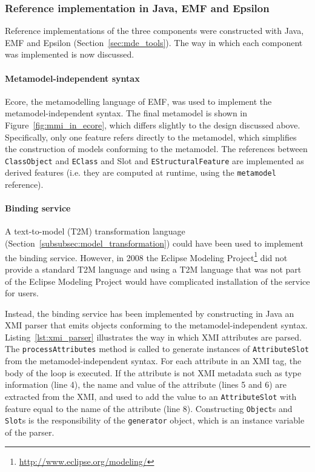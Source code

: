 \subsubsection{Reference implementation in Java, EMF and Epsilon}
\label{subsubsec:mmi_impl}
Reference implementations of the three components were constructed with Java, EMF and Epsilon (Section~\ref{sec:mde_tools}). The way in which each component was implemented is now discussed.

\paragraph{Metamodel-independent syntax} Ecore, the metamodelling language of EMF, was used to implement the metamodel-independent syntax. The final metamodel is shown in Figure~\ref{fig:mmi_in_ecore}, which differs slightly to the design discussed above. Specifically, only one feature refers directly to the metamodel, which simplifies the construction of models conforming to the metamodel. The references between \texttt{Cl\-a\-ssOb\-je\-ct} and \texttt{ECl\-a\-ss} and Slot and \texttt{ESt\-ru\-ct\-ur\-alFe\-at\-u\-re} are implemented as derived features (i.e. they are computed at runtime, using the \texttt{me\-ta\-mo\-del} reference). 

\paragraph{Binding service} A text-to-model (T2M) transformation language (Section~\ref{subsubsec:model_transformation}) could have been used to implement the binding service. However, in 2008 the Eclipse Modeling Project\footnote{\url{http://www.eclipse.org/modeling/}} did not provide a standard T2M language and using a T2M language that was not part of the Eclipse Modeling Project would have complicated installation of the service for users.

Instead, the binding service has been implemented by constructing in Java an XMI parser that emits objects conforming to the metamodel-independent syntax. Listing~\ref{lst:xmi_parser} illustrates the way in which XMI attributes are parsed. The \texttt{pr\-oc\-e\-ssAtt\-rib\-ut\-es} method is called to generate instances of \texttt{At\-tr\-ibu\-teSl\-ot} from the metamodel-independent syntax. For each attribute in an XMI tag, the body of the loop is executed. If the attribute is not XMI metadata such as type information (line 4), the name and value of the attribute (lines 5 and 6) are extracted from the XMI, and used to add the value to an \texttt{At\-tr\-ibu\-teSl\-ot} with feature equal to the name of the attribute (line 8). Constructing \texttt{O\-bj\-e\-ct}s and \texttt{Sl\-ot}s is the responsibility of the \texttt{ge\-ne\-ra\-tor} object, which is an instance variable of the parser.


